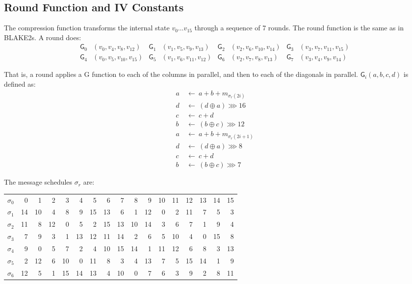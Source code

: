 \documentclass[11pt,notitlepage,a4paper]{article}
\newcommand{\GG}{\mathsf{G}}
\begin{document}
\begin{appendices}

\section{Round Function and IV Constants}\label{sec:roundfn}

The compression function transforms the internal state $v_{0} \ldots
v_{15}$ through a sequence of 7 rounds. The round function is the same as
in BLAKE2s. A round does:
\begin{align*}
    \GG_{0}&(v_{0}, v_{4}, v_{8}, v_{12}) &
    \GG_{1}&(v_{1}, v_{5}, v_{9}, v_{13}) &
    \GG_{2}&(v_{2}, v_{6}, v_{10}, v_{14}) &
    \GG_{3}&(v_{3}, v_{7}, v_{11}, v_{15}) \\
    \GG_{4}&(v_{0}, v_{5}, v_{10}, v_{15}) &
    \GG_{5}&(v_{1}, v_{6}, v_{11}, v_{12}) &
    \GG_{6}&(v_{2}, v_{7}, v_{8}, v_{13}) &
    \GG_{7}&(v_{3}, v_{4}, v_{9}, v_{14})
\end{align*}

That is, a round applies a G function to each of the columns in parallel,
and then to each of the diagonals in parallel. $\GG_i(a, b, c, d)$ is
defined as:
\begin{align*}
    a \ & \leftarrow \ a + b + m_{\sigma_r(2i)} \\
    d \ & \leftarrow \ (d \oplus a) \ggg 16 \\
    c \ & \leftarrow \ c + d \\
    b \ & \leftarrow \ (b \oplus c) \ggg 12 \\
    a \ & \leftarrow \ a + b + m_{\sigma_r(2i+1)} \\
    d \ & \leftarrow \ (d \oplus a) \ggg 8 \\
    c \ & \leftarrow \ c + d \\
    b \ & \leftarrow \ (b \oplus c) \ggg 7
\end{align*}

The message schedules $\sigma_r$ are:

\begin{center}
\begin{tabular}{ | r | r r r r r r r r r r r r r r r r | }
    \hline
    $\sigma_0$ & 0 & 1 & 2 & 3 & 4 & 5 & 6 & 7 & 8 & 9 & 10 & 11 & 12 & 13 & 14 & 15 \\
    $\sigma_1$ & 14 & 10 & 4 & 8 & 9 & 15 & 13 & 6 & 1 & 12 & 0 & 2 & 11 & 7 & 5 & 3 \\
    $\sigma_2$ & 11 & 8 & 12 & 0 & 5 & 2 & 15 & 13 & 10 & 14 & 3 & 6 & 7 & 1 & 9 & 4 \\
    $\sigma_3$ & 7 & 9 & 3 & 1 & 13 & 12 & 11 & 14 & 2 & 6 & 5 & 10 & 4 & 0 & 15 & 8 \\
    $\sigma_4$ & 9 & 0 & 5 & 7 & 2 & 4 & 10 & 15 & 14 & 1 & 11 & 12 & 6 & 8 & 3 & 13 \\
    $\sigma_5$ & 2 & 12 & 6 & 10 & 0 & 11 & 8 & 3 & 4 & 13 & 7 & 5 & 15 & 14 & 1 & 9 \\
    $\sigma_6$ & 12 & 5 & 1 & 15 & 14 & 13 & 4 & 10 & 0 & 7 & 6 & 3 & 9 & 2 & 8 & 11 \\
    \hline
\end{tabular}
\end{center}


\end{appendices}
\end{document}
